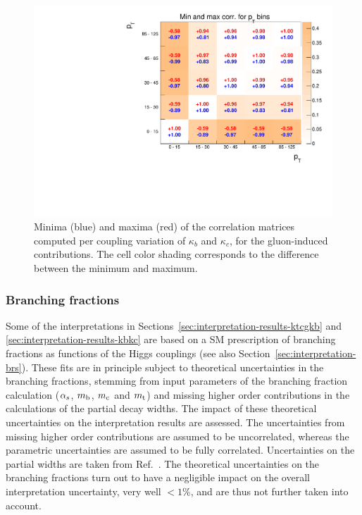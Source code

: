 \begin{figure}[hbtp]
  \begin{center}
    \includegraphics[width=\halflinewidth]{img/interpretation/other/minmax_corrMat_exp.pdf}
    \caption{
        Minima (blue) and maxima (red) of the correlation matrices computed per coupling variation of $\kappa_b$ and $\kappa_c$, for the gluon-induced contributions.
        The cell color shading corresponds to the difference between the minimum and maximum.
        }
    \label{fig:corrmat-minmax}
  \end{center}
\end{figure}




\subsubsection{Branching fractions}

Some of the interpretations in Sections~\ref{sec:interpretation-results-ktcgkb} and \ref{sec:interpretation-results-kbkc} are based on a SM prescription of branching fractions as functions of the Higgs couplings (see also Section~\ref{sec:interpretation-brs}).
% 
These fits are in principle subject to theoretical uncertainties in the branching fractions, stemming from input parameters of the branching fraction calculation ($\alpha_s$, $m_{\mathrm{b}}$, $m_{\mathrm{c}}$ and $m_{\mathrm{t}}$) and missing higher order contributions in the calculations of the partial decay widths.
% 
The impact of these theoretical uncertainties on the interpretation results are assessed.
% 
The uncertainties from missing higher order contributions are assumed to be uncorrelated, whereas the parametric uncertainties are assumed to be fully correlated.
% 
Uncertainties on the partial widths are taken from Ref.~\cite{deFlorian:2016spz}.
% 
% 
The theoretical uncertainties on the branching fractions turn out to have a negligible impact on the overall interpretation uncertainty, very well ${<}1\%$, and are thus not further taken into account.


